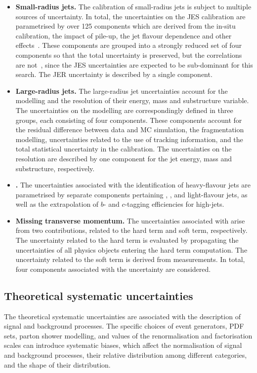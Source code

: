 \begin{itemize}
  \item \textbf{Small-radius jets.} The calibration of small-radius jets is subject to multiple sources of uncertainty. In total, the uncertainties on the JES calibration are parametrised by over 125 components which are derived from the in-situ calibration, the impact of pile-up, the jet flavour dependence and other effects~\cite{JETM-2018-05}. These components are grouped into a strongly reduced set of four components so that the total uncertainty is preserved, but the correlations are not~\cite{PERF-2012-01}, since the JES uncertainties are expected to be sub-dominant for this search. The JER uncertainty is described by a single component.
  \item \textbf{Large-radius jets.} The large-radius jet uncertainties account for the modelling and the resolution of their energy, mass and \dtwo substructure variable. The uncertainties on the modelling are correspondingly defined in three groups, each consisting of four components. These components account for the residual difference between data and MC simulation, the fragmentation modelling, uncertainties related to the use of tracking information, and the total statistical uncertainty in the calibration. The uncertainties on the resolution are described by one component for the jet energy, mass and \dtwo substructure, respectively.
  \item \textbf{\btagging.} The uncertainties associated with the identification of heavy-flavour jets are parametrised by separate components pertaining \bjets, \cjets, and light-flavour jets, as well as the extrapolation of \(b\)- and \(c\)-tagging efficiencies for high-\pt jets.
  \item \textbf{Missing transverse momentum.} The uncertainties associated with \met arise from two contributions, related to the \met hard term and soft term, respectively. The uncertainty related to the hard term is evaluated by propagating the uncertainties of all physics objects entering the hard term computation. The uncertainty related to the soft term is derived from measurements. In total, four components associated with the \met uncertainty are considered.
 \end{itemize}


\subsection{Theoretical systematic uncertainties}
\label{sec:monoV:systematics:theoretical}
The theoretical systematic uncertainties are associated with the description of signal and background processes. The specific choices of event generators, PDF sets, parton shower modelling, and values of the renormalisation and factorisation scales can introduce systematic biases, which affect the normalisation of signal and background processes, their relative distribution among different categories, and the shape of their \met distribution.

